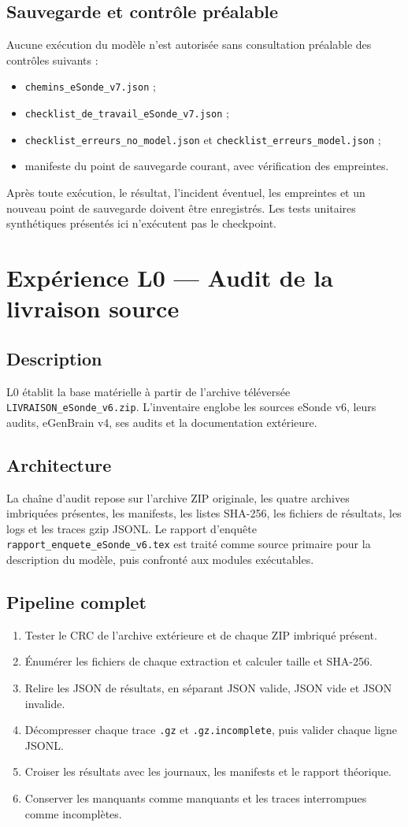 \documentclass[11pt,a4paper]{report}
\begin{document}
\section{Sauvegarde et contrôle préalable}
Aucune exécution du modèle n'est autorisée sans consultation préalable des contrôles suivants :
\begin{itemize}[nosep]
\item \texttt{chemins\_eSonde\_v7.json} ;
\item \texttt{checklist\_de\_travail\_eSonde\_v7.json} ;
\item \texttt{checklist\_erreurs\_no\_model.json} et \texttt{checklist\_erreurs\_model.json} ;
\item manifeste du point de sauvegarde courant, avec vérification des empreintes.
\end{itemize}
Après toute exécution, le résultat, l'incident éventuel, les empreintes et un nouveau point de sauvegarde doivent être enregistrés. Les tests unitaires synthétiques présentés ici n'exécutent pas le checkpoint.

\chapter{Expérience L0 — Audit de la livraison source}
\section{Description}
L0 établit la base matérielle à partir de l'archive téléversée \texttt{LIVRAISON\_eSonde\_v6.zip}. L'inventaire englobe les sources eSonde v6, leurs audits, eGenBrain v4, ses audits et la documentation extérieure.
\section{Architecture}
La chaîne d'audit repose sur l'archive ZIP originale, les quatre archives imbriquées présentes, les manifests, les listes SHA-256, les fichiers de résultats, les logs et les traces gzip JSONL. Le rapport d'enquête \texttt{rapport\_enquete\_eSonde\_v6.tex} est traité comme source primaire pour la description du modèle, puis confronté aux modules exécutables.
\section{Pipeline complet}
\begin{enumerate}[nosep]
\item Tester le CRC de l'archive extérieure et de chaque ZIP imbriqué présent.
\item Énumérer les fichiers de chaque extraction et calculer taille et SHA-256.
\item Relire les JSON de résultats, en séparant JSON valide, JSON vide et JSON invalide.
\item Décompresser chaque trace \texttt{.gz} et \texttt{.gz.incomplete}, puis valider chaque ligne JSONL.
\item Croiser les résultats avec les journaux, les manifests et le rapport théorique.
\item Conserver les manquants comme manquants et les traces interrompues comme incomplètes.
\end{enumerate}
\end{document}
